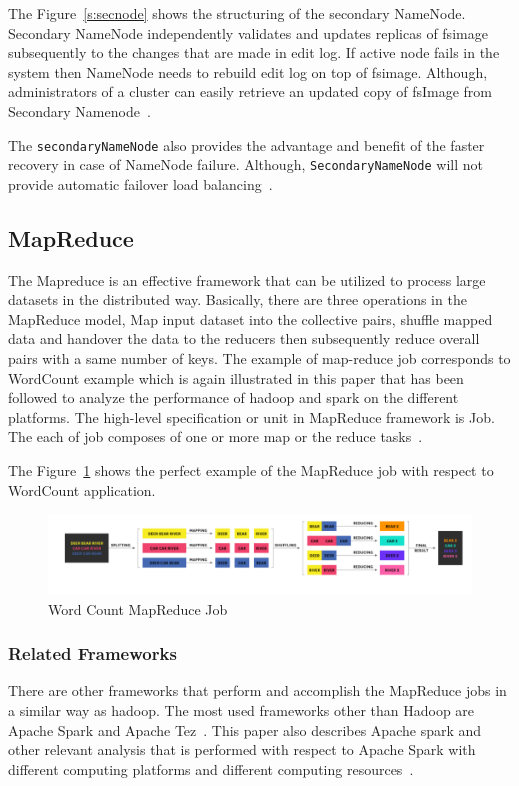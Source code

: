 The Figure~\ref{s:secnode} shows the structuring of the secondary NameNode. 
Secondary NameNode independently validates and updates replicas of fsimage 
subsequently to the changes that are made in edit log. If active node fails in 
the system then NameNode needs to rebuild edit log on top of fsimage. Although, 
administrators of  a cluster can easily retrieve an updated copy of fsImage from
Secondary Namenode~\cite{hid-sp18-412-hadoop-architecture-overview}.

The \verb|secondaryNameNode| also provides the advantage 
and benefit of the faster recovery in case of NameNode failure. 
Although, \verb|SecondaryNameNode|
will not provide automatic failover 
load balancing~\cite{hid-sp18-412-hadoop-architecture-overview}.

\subsection{MapReduce}
The Mapreduce is an effective framework that can be 
utilized to process large datasets in the distributed way. 
Basically, there are three operations in the MapReduce model, 
Map input dataset into the collective pairs, 
shuffle mapped data and handover the data to the 
reducers then subsequently reduce overall pairs 
with a same number of keys. The example of 
map-reduce job corresponds to WordCount example 
which is again illustrated in this paper that has 
been followed to analyze the performance of hadoop 
and spark on the different platforms. 
The high-level specification or unit in 
MapReduce framework is Job. The each of 
job composes of one or 
more map or the reduce tasks~\cite{hid-sp18-412-hadoop-architecture-overview}. 

The Figure~\ref{s:mapreduce} 
shows the perfect example of the 
MapReduce job with respect to WordCount application.

\begin{figure}[!ht]
\centering\includegraphics[width=\textwidth]{images/WordCountMapReduce.png}
\caption{Word Count 
MapReduce 
Job~\cite{hid-sp18-412-hadoop-architecture-overview}}\label{s:mapreduce}
\end{figure}

\subsubsection{Related Frameworks}
There are other frameworks that perform and accomplish the 
MapReduce jobs in a similar way as hadoop. 
The most used frameworks 
other than Hadoop are Apache Spark and Apache Tez~\cite{hid-sp18-412-tez}. 
This paper also describes Apache spark and other relevant 
analysis that is performed with respect to Apache Spark 
with different computing platforms and
different computing resources~\cite{hid-sp18-412-hadoop-architecture-overview}.


